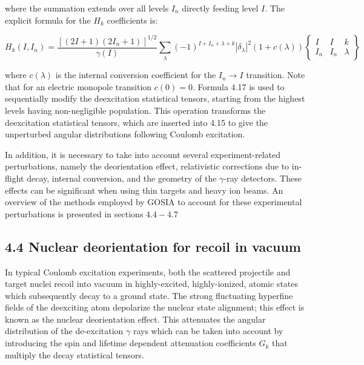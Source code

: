 \documentclass[10pt]{article}
\begin{document}
where the summation extends over all levels $I_{n}$ directly feeding level $I$. The explicit formula for the $H_{k}$ coefficients is:

\[
H_{k}\left(I, I_{n}\right)=\frac{\left[(2 I+1)\left(2 I_{n}+1\right)\right]^{1 / 2}}{\gamma(I)} \sum_{\lambda}(-1)^{I+I_{n}+\lambda+k}\left|\delta_{\lambda}\right|^{2}(1+c(\lambda))\left\{\begin{array}{ccc}
I & I & k  \tag{4.18}\\
I_{n} & I_{n} & \lambda
\end{array}\right\}
\]

where $c(\lambda)$ is the internal conversion coefficient for the $I_{n} \rightarrow I$ transition. Note that for an electric monopole transition $c(0)=0$. Formula 4.17 is used to sequentially modify the deexcitation statistical tensors, starting from the highest levels having non-negligible population. This operation transforms the deexcitation statistical tensors, which are inserted into 4.15 to give the unperturbed angular distributions following Coulomb excitation.

In addition, it is necessary to take into account several experiment-related perturbations, namely the deorientation effect, relativistic corrections due to in-flight decay, internal conversion, and the geometry of the $\gamma$-ray detectors. These effects can be significant when using thin targets and heavy ion beams. An overview of the methods employed by GOSIA to account for these experimental perturbations is presented in sections $4.4-4.7$

\subsection*{4.4 Nuclear deorientation for recoil in vacuum}
In typical Coulomb excitation experiments, both the scattered projectile and target nuclei recoil into vacuum in highly-excited, highly-ionized, atomic states which subsequently decay to a ground state. The strong fluctuating hyperfine fields of the deexciting atom depolarize the nuclear state alignment; this effect is known as the nuclear deorientation effect. This attenuates the angular distribution of the de-excitation $\gamma$ rays which can be taken into account by introducing the spin and lifetime dependent attenuation coefficients $G_{k}$ that multiply the decay statistical tensors.
\end{document}
